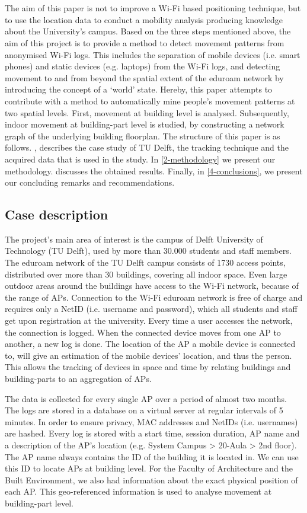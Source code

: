 \\\\
The aim of this paper is not to improve a Wi-Fi based positioning technique, but to use the location data to conduct a mobility analysis producing knowledge about the University’s campus. Based on the three steps mentioned above, the aim of this project is to provide a method to detect movement patterns from anonymised Wi-Fi logs. This includes the separation of mobile devices (i.e. smart phones) and static devices (e.g. laptops) from the Wi-Fi logs, and detecting movement to and from beyond the spatial extent of the eduroam network by introducing the concept of a ‘world’ state. Hereby, this paper attempts to contribute with a method to automatically mine people’s movement patterns at two spatial levels. First, movement at building level is analysed. Subsequently, indoor movement at building-part level is studied, by constructing a network graph of the underlying building floorplan. 
The structure of this paper is as follows. , describes the case study of TU Delft, the tracking technique and the acquired data that is used in the study. In \autoref{2-methodology} we present our methodology.  discusses the obtained results. Finally, in \autoref{4-conclusions}, we present our concluding remarks and recommendations. 

\subsection{Case description}\label{ES-caseDescription}
The project’s main area of interest is the campus of Delft University of Technology (TU Delft), used by more than 30.000 students and staff members. The eduroam network of the TU Delft campus consists of 1730 access points, distributed over more than 30 buildings, covering all indoor space. Even large outdoor areas around the buildings have access to the Wi-Fi network, because of the range of APs. Connection to the Wi-Fi eduroam network is free of charge and requires only a NetID (i.e. username and password), which all students and staff get upon registration at the university. Every time a user accesses the network, the connection is logged. When the connected device moves from one AP to another, a new log is done. The location of the AP a mobile device is connected to, will give an estimation of the mobile devices’ location, and thus the person. This allows the tracking of devices in space and time by relating buildings and building-parts to an aggregation of APs.

The data is collected for every single AP over a period of almost two months. The logs are stored in a database on a virtual server at regular intervals of 5 minutes. In order to ensure privacy, MAC addresses and NetIDs (i.e. usernames) are hashed. Every log is stored with a start time, session duration, AP name and a description of the AP’s location (e.g. System Campus > 20-Aula > 2nd floor). The AP name always contains the ID of the building it is located in. We can use this ID to locate APs at building level. For the Faculty of Architecture and the Built Environment, we also had information about the exact physical position of each AP. This geo-referenced information is used to analyse movement at building-part level.
